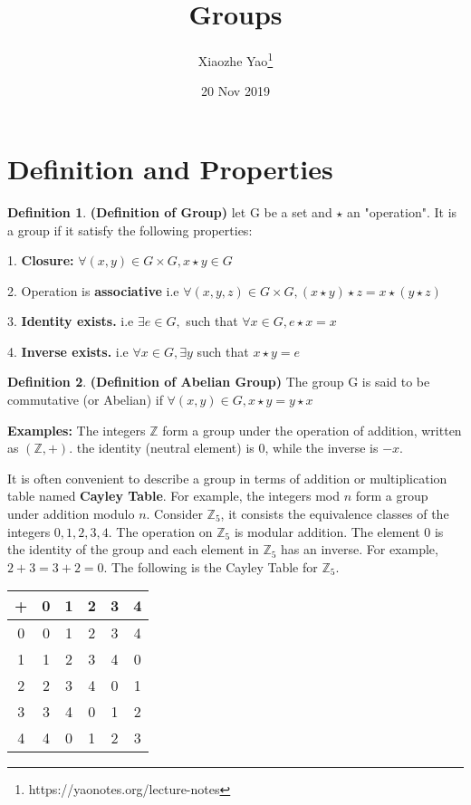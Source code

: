 \documentclass{article}
\title{Groups}
\author{Xiaozhe Yao\footnote{https://yaonotes.org/lecture-notes}}
\date{20 Nov 2019}
\theoremstyle{definition}
\newtheorem{defi}{Definition}[subsection]
\begin{document}
\maketitle

\section{Definition and Properties}

\begin{defi}
\textbf{(Definition of Group)} let G be a set and $\star$ an "operation". It is a group if it satisfy the following properties:

1. \textbf{Closure:} $\forall (x,y) \in G \times G, x \star y \in G $

2. Operation is \textbf{associative} i.e $\forall (x, y, z) \in G \times G, (x \star y) \star z = x \star (y \star z) $

3. \textbf{Identity exists.} i.e $\exists e \in G,$ such that $\forall x \in G, e \star x = x $

4. \textbf{Inverse exists.} i.e $\forall x \in G, \exists y$ such that $x \star y = e$
\end{defi}

\begin{defi}
\textbf{(Definition of Abelian Group)} The group G is said to be commutative (or Abelian) if $\forall (x,y) \in G, x \star y = y \star x$

\noindent\textbf{Examples:} The integers $\mathbb{Z}$ form a group under the operation of addition, written as $(\mathbb{Z}, +)$. the identity (neutral element) is $0$, while the inverse is $-x$.
\end{defi}

\noindent It is often convenient to describe a group in terms of addition or multiplication table named \textbf{Cayley Table}. For example, the integers mod $n$ form a group under addition modulo $n$. Consider $\mathbb{Z}_5$, it consists the equivalence classes of the integers $0,1,2,3,4$. The operation on $\mathbb{Z}_5$ is modular addition. The element $0$ is the identity of the group and each element in $\mathbb{Z}_5$ has an inverse. For example, $2+3 = 3+2 = 0$. The following is the Cayley Table for $\mathbb{Z}_5$.

\begin{center}
\begin{tabular}{ |c|c|c|c|c|c| } 
\hline
+ & 0 & 1 & 2 & 3 & 4 \\
\hline
0 & 0 & 1 & 2 & 3 & 4 \\ 
1 & 1 & 2 & 3 & 4 & 0 \\ 
2 & 2 & 3 & 4 & 0 & 1 \\ 
3 & 3 & 4 & 0 & 1 & 2 \\ 
4 & 4 & 0 & 1 & 2 & 3 \\
\hline
\end{tabular}
\end{center}
\end{document}
